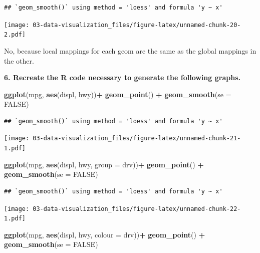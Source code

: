 \documentclass[]{book}
\newenvironment{Shaded}{\begin{snugshade}}{\end{snugshade}}
\newcommand{\DataTypeTok}[1]{\textcolor[rgb]{0.13,0.29,0.53}{#1}}
\newcommand{\KeywordTok}[1]{\textcolor[rgb]{0.13,0.29,0.53}{\textbf{#1}}}
\newcommand{\NormalTok}[1]{#1}
\newcommand{\OperatorTok}[1]{\textcolor[rgb]{0.81,0.36,0.00}{\textbf{#1}}}
\newcommand{\OtherTok}[1]{\textcolor[rgb]{0.56,0.35,0.01}{#1}}
\newcommand{\StringTok}[1]{\textcolor[rgb]{0.31,0.60,0.02}{#1}}
\theoremstyle{definition}
\theoremstyle{definition}
\theoremstyle{definition}
\theoremstyle{remark}
\begin{document}
\begin{verbatim}
## `geom_smooth()` using method = 'loess' and formula 'y ~ x'
\end{verbatim}

\texttt{[image: 03-data-visualization\_files/figure-latex/unnamed-chunk-20-2.pdf]}

No, because local mappings for each geom are the same as the global
mappings in the other.

\textbf{6. Recreate the R code necessary to generate the following
graphs.}

\begin{Shaded}
\begin{Highlighting}[]
\KeywordTok{ggplot}\NormalTok{(mpg, }\KeywordTok{aes}\NormalTok{(displ, hwy))}\OperatorTok{+}
\StringTok{  }\KeywordTok{geom_point}\NormalTok{() }\OperatorTok{+}
\StringTok{  }\KeywordTok{geom_smooth}\NormalTok{(}\DataTypeTok{se =} \OtherTok{FALSE}\NormalTok{)}
\end{Highlighting}
\end{Shaded}

\begin{verbatim}
## `geom_smooth()` using method = 'loess' and formula 'y ~ x'
\end{verbatim}

\texttt{[image: 03-data-visualization\_files/figure-latex/unnamed-chunk-21-1.pdf]}

\begin{Shaded}
\begin{Highlighting}[]
\KeywordTok{ggplot}\NormalTok{(mpg, }\KeywordTok{aes}\NormalTok{(displ, hwy, }\DataTypeTok{group =}\NormalTok{ drv))}\OperatorTok{+}
\StringTok{  }\KeywordTok{geom_point}\NormalTok{() }\OperatorTok{+}
\StringTok{  }\KeywordTok{geom_smooth}\NormalTok{(}\DataTypeTok{se =} \OtherTok{FALSE}\NormalTok{)}
\end{Highlighting}
\end{Shaded}

\begin{verbatim}
## `geom_smooth()` using method = 'loess' and formula 'y ~ x'
\end{verbatim}

\texttt{[image: 03-data-visualization\_files/figure-latex/unnamed-chunk-22-1.pdf]}

\begin{Shaded}
\begin{Highlighting}[]
\KeywordTok{ggplot}\NormalTok{(mpg, }\KeywordTok{aes}\NormalTok{(displ, hwy, }\DataTypeTok{colour =}\NormalTok{ drv))}\OperatorTok{+}
\StringTok{  }\KeywordTok{geom_point}\NormalTok{() }\OperatorTok{+}
\StringTok{  }\KeywordTok{geom_smooth}\NormalTok{(}\DataTypeTok{se =} \OtherTok{FALSE}\NormalTok{)}
\end{Highlighting}
\end{Shaded}
\end{document}
